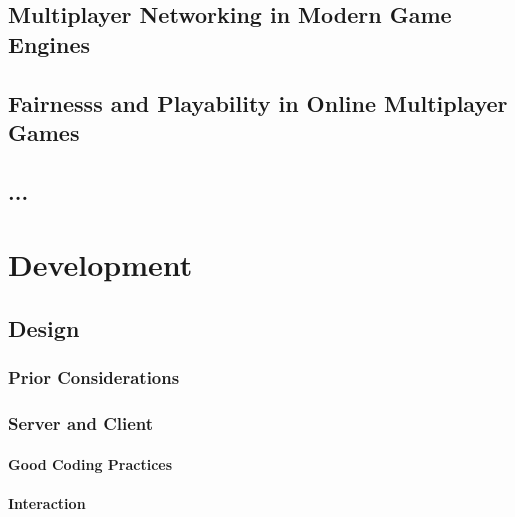 \documentclass[bsc,frontabs,twoside,singlespacing,parskip,deptreport]{infthesis}     %
\begin{document}
\section{Multiplayer Networking in Modern Game Engines}

\section{Fairnesss and Playability in Online Multiplayer Games}

\section{...}





\chapter{Development}
\section{Design}
\subsection{Prior Considerations}
\subsection{Server and Client}
\subsubsection{Good Coding Practices}
\subsubsection{Interaction}
\end{document}
